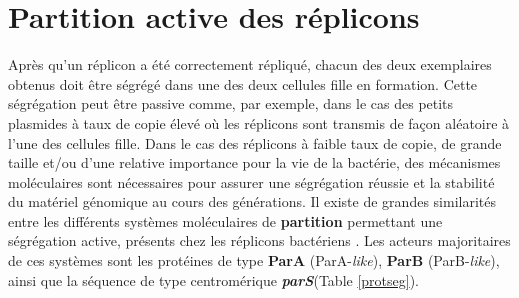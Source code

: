  \section{Partition active des réplicons}\label{segreg}
	Après qu'un réplicon a été correctement répliqué, chacun des deux exemplaires obtenus doit être ségrégé dans une des deux cellules fille en formation. Cette ségrégation peut être passive comme, par exemple, dans le cas des petits plasmides à taux de copie élevé \citep{Ebersbach2005} où les réplicons sont transmis de façon aléatoire à l'une des cellules fille. Dans le cas des réplicons à faible taux de copie, de grande taille et/ou d'une relative importance pour la vie de la bactérie, des mécanismes moléculaires sont nécessaires pour assurer une ségrégation réussie et la stabilité du matériel génomique au cours des générations. Il existe de grandes similarités entre les différents systèmes moléculaires de \textbf{partition} permettant une ségrégation active, présents chez les réplicons bactériens \citep{funnell2004partition}. Les acteurs majoritaires de ces systèmes sont les protéines de type \textbf{ParA} (ParA-\textit{like}), \textbf{ParB} (ParB-\textit{like}), ainsi que la séquence de type centromérique \textit{\textbf{parS}}(Table \ref{protseg}).
	 
